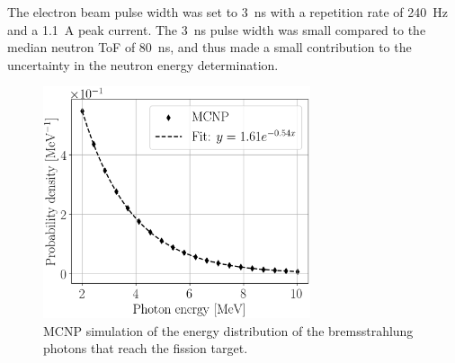 The electron beam pulse width was set to 3~ns with a repetition rate of 240~Hz and a 1.1~A peak current.
The 3~ns pulse width was small compared to the median neutron ToF of 80~ns, and thus made a small contribution to the uncertainty in the neutron energy determination.

\begin{figure}[h]
\centering
\includegraphics[width=0.7\textwidth]{Content/Methods/MCNPBremDistribution.png}
\caption{MCNP simulation of the energy distribution of the bremsstrahlung photons that reach the fission target.}
\label{fig:BremDist}
\end{figure}

